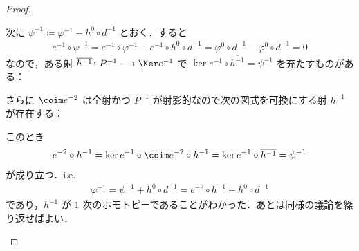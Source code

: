 \documentclass[algtopo_main]{subfiles}
\begin{document}
\begin{proof}
\begin{description}
    次に $\psi^{-1} \coloneqq \varphi^{-1} - h^0 \circ d^{-1}$ とおく．すると
    \begin{align}
        e^{-1} \circ \psi^{-1} = e^{-1} \circ \varphi^{-1} - e^{-1} \circ h^0 \circ d^{-1} = \varphi^0 \circ d^{-1} - \varphi^0 \circ d^{-1} = 0
    \end{align}
    なので，ある射 $\overline{h^{-1}} \colon P^{-1} \lto \Ker e^{-1}$ で $\ker e^{-1} \circ \overline{h^{-1}} = \psi^{-1}$ を充たすものがある：
    \begin{figure}[H]
        \centering
    \end{figure}%
    さらに $\coim e^{-2}$ は全射かつ $P^{-1}$ が射影的なので次の図式を可換にする射 $h^{-1}$ が存在する：
    \begin{figure}[H]
        \centering
    \end{figure}%
    このとき
    \begin{align}
        e^{-2} \circ h^{-1} = \ker e^{-1} \circ \coim e^{-2} \circ h^{-1} = \ker e^{-1} \circ \overline{h^{-1}} = \psi^{-1}
    \end{align}
    が成り立つ．i.e. 
    \begin{align}
        \varphi^{-1} = \psi^{-1} + h^0 \circ d^{-1} = e^{-2} \circ h^{-1} + h^0 \circ d^{-1}
    \end{align}
    であり，$h^{-1}$ が $1$ 次のホモトピーであることがわかった．あとは同様の議論を繰り返せばよい．
\end{description}
\end{proof}
\end{document}
